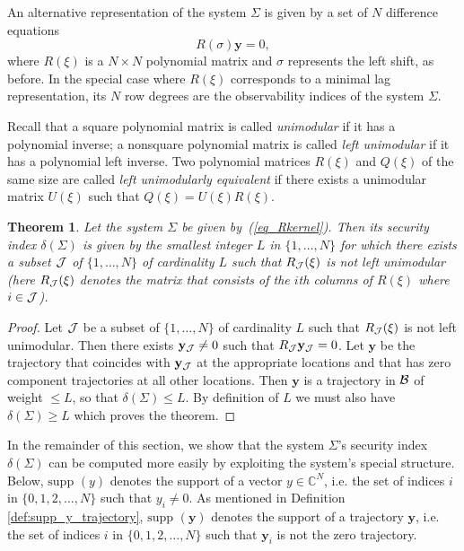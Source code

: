 \documentclass[letterpaper, 10 pt, conference]{ieeeconf}
\newcommand{\B}{{\cal B}}
\newcommand{\J}{{\cal J}}
\newcommand{\supp}{\mbox{supp }}
\newcommand{\ybold}{\mathbf{y}}
\newcommand{\beq}{\begin{equation}}
\newcommand{\eeq}{\end{equation}}
\newcommand{\param}{\xi}
\newtheorem{thm}{Theorem}[section]
\begin{document}
An alternative representation of the system $\Sigma$ is given by a set of $N$ difference equations
\beq
R(\sigma ) \ybold = 0 ,\label{eq_Rkernel}
\eeq
where $R(\xi)$ is a $N\times N$ polynomial matrix and $\sigma$ represents the left shift, as before.
In the special case where $R(\param)$ corresponds to a minimal lag representation, its $N$ row degrees are the observability indices of the system $\Sigma$. 

Recall that a square polynomial matrix is called {\em unimodular} if it has a polynomial inverse; a nonsquare polynomial matrix is called {\em left unimodular} if it has a polynomial left inverse. Two polynomial matrices $R(\param)$ and $Q(\param)$ of the same size are called {\em left unimodularly equivalent} if there exists a unimodular matrix $U(\param)$ such that $Q(\param) = U(\param) R(\param)$.

\begin{thm}\label{thm_RJ}
Let the system $\Sigma$ be given by~(\ref{eq_Rkernel}). Then its security index $\delta (\Sigma ) $ is given by the smallest integer $L$ in $\{1,\ldots , N\}$ for which there exists a subset $\J$ of $\{1,\ldots , N\}$ of cardinality $L$ such that $R_\J(\xi)$ is not left unimodular (here $R_\J(\xi)$ denotes the matrix that consists of the $i$th columns of $R(\xi)$ where $i\in \J$).
\end{thm}
\begin{proof}
		Let $\J$ be a subset of $\{1,\ldots , N\}$ of cardinality $L$ such that $R_\J(\xi)$ is not left unimodular. Then there exists $\ybold_{\J} \neq 0$ such that $R_\J \ybold_{\J} =0$. Let $\ybold $ be the trajectory that coincides with $\ybold_\J$ at the appropriate locations and that has zero component trajectories at all other locations. Then $\ybold$ is a trajectory in $\B$ of weight $\leq L$, so that $\delta (\Sigma ) \leq L$. By definition of $L$ we must also have $\delta (\Sigma ) \geq L$ which proves the theorem.
\end{proof}

In the remainder of this section, we show that the system $\Sigma$'s security index $\delta(\Sigma)$ can be computed more easily by exploiting the system's special structure. Below, $\supp(y)$ denotes the support of a vector $y \in {\mathbb C}^N$, i.e. the set of indices $i$ in $\{ 0,1, 2, \ldots , N\}$ such that $y_i \neq 0$. As mentioned in Definition \ref{def:supp_y_trajectory}, $\supp(\ybold)$ denotes the support of a trajectory $\ybold$, i.e. the set of indices $i$ in $\{ 0,1, 2, \ldots , N\}$ such that $\ybold_i $ is not the zero trajectory. 
\end{document}
